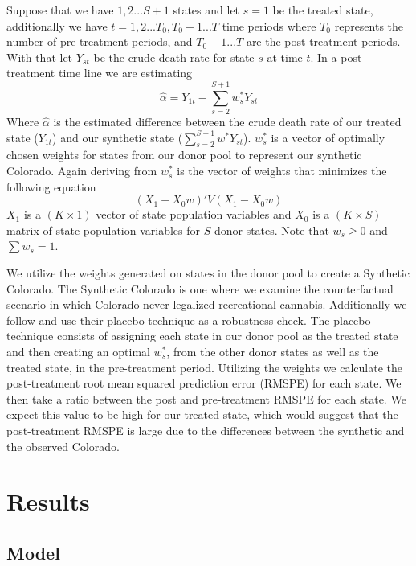 \documentclass{article}
\begin{document}
Suppose that we have $1,2...S+1$ states and let $s = 1$ be the treated state, additionally we have $t = 1,2...T_0,T_0+1...T$ time periods where $T_0$ represents the number of pre-treatment periods, and $T_0 + 1...T$ are the post-treatment periods. With that let $Y_{st}$ be the crude death rate for state $s$ at time $t$. In a post-treatment time line we are estimating
\begin{equation*}
\hat{\alpha} = Y_{1t} - \sum_{s=2}^{S+1}w^{*}_sY_{st}
\end{equation*}
Where $\hat{\alpha}$ is the estimated difference between the crude death rate of our treated state ($Y_{1t}$) and our synthetic state ($\sum_{s=2}^{S+1}w^{*}Y_{st}$). $w^{*}_s$ is a vector of optimally chosen weights for states from our donor pool to represent our synthetic Colorado. Again deriving from \citet{AbadieAlberto2010SCMf} $w^{*}_s$ is the vector of weights that minimizes the following equation
\begin{equation*}
(X_1 - X_0w)'V(X_1 - X_0w)
\end{equation*}
$X_1$ is a $(K \times 1)$ vector of state population variables and $X_0$ is a $(K \times S)$ matrix of state population variables for $S$ donor states. Note that $w_s \geq 0$ and $\sum w_s = 1$.

We utilize the weights generated on states in the donor pool to create a Synthetic Colorado. The Synthetic Colorado is one where we examine the counterfactual scenario in which Colorado never legalized recreational cannabis. Additionally we follow \citet{AbadieAlberto2010SCMf} and use their placebo technique as a robustness check. The placebo technique consists of assigning each state in our donor pool as the treated state and then creating an optimal $w^{*}_s$, from the other donor states as well as the treated state, in the pre-treatment period. Utilizing the weights we calculate the post-treatment root mean squared prediction error (RMSPE) for each state. We then take a ratio between the post and pre-treatment RMSPE for each state. We expect this value to be high for our treated state, which would suggest that the post-treatment RMSPE is large due to the differences between the synthetic and the observed Colorado.

\section{Results}

\subsection{Model}
\end{document}
